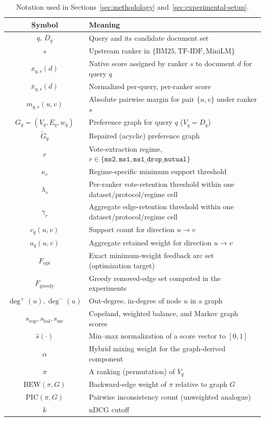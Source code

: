 \documentclass[manuscript,anonymous,review]{acmart}
\begin{document}
\begin{table}[t]
  \caption{Notation used in Sections~\ref{sec:methodology}
    and~\ref{sec:experimental-setup}.}
  \label{tab:notation}
  \begin{tabular}{cl}
    \toprule
    Symbol & Meaning \\
    \midrule
    $q$, $D_q$ & Query and its candidate document set \\
    $s$ & Upstream ranker in $\{\mathrm{BM25},\mathrm{TF\mbox{-}IDF},\mathrm{MiniLM}\}$ \\
    $x_{q,s}(d)$ & Native score assigned by ranker $s$ to document $d$ for query $q$ \\
    $\bar{x}_{q,s}(d)$ & Normalized per-query, per-ranker score \\
    $m_{q,s}(u,v)$ & Absolute pairwise margin for pair $\{u,v\}$ under ranker $s$ \\
    $G_q=(V_q,E_q,w_q)$ & Preference graph for query $q$ ($V_q = D_q$) \\
    $\widetilde G_q$ & Repaired (acyclic) preference graph \\
    $r$ & Vote-extraction regime, $r\in\{\texttt{ms2},\texttt{ms1},\texttt{ms1\_drop\_mutual}\}$ \\
    $\kappa_r$ & Regime-specific minimum support threshold \\
    $\lambda_s$ & Per-ranker vote-retention threshold within one dataset/protocol/regime cell \\
    $\gamma_r$ & Aggregate edge-retention threshold within one dataset/protocol/regime cell \\
    $c_q(u,v)$ & Support count for direction $u \rightarrow v$ \\
    $a_q(u,v)$ & Aggregate retained weight for direction $u \rightarrow v$ \\
    $F_{\mathrm{opt}}$ & Exact minimum-weight feedback arc set (optimization target) \\
    $F_{\mathrm{greedy}}$ & Greedy removed-edge set computed in the experiments \\
    $\deg^+(u),\deg^-(u)$ & Out-degree, in-degree of node $u$ in a graph \\
    $s_{\mathrm{cop}}, s_{\mathrm{bal}}, s_{\mathrm{mc}}$ & Copeland, weighted balance, and Markov graph scores \\
    $\hat{s}(\cdot)$ & Min--max normalization of a score vector to $[0,1]$ \\
    $\alpha$ & Hybrid mixing weight for the graph-derived component \\
    $\pi$ & A ranking (permutation) of $V_q$ \\
    $\mathrm{BEW}(\pi,G)$ & Backward-edge weight of $\pi$ relative to graph $G$ \\
    $\mathrm{PIC}(\pi,G)$ & Pairwise inconsistency count (unweighted analogue) \\
    $k$ & nDCG cutoff \\
    \bottomrule
  \end{tabular}
\end{table}
\end{document}
